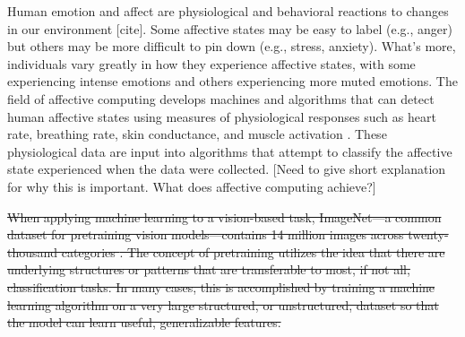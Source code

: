 \documentclass[12pt]{iopart}
\begin{document}
Human emotion and affect are physiological and behavioral reactions to changes in our environment [cite]. Some affective states may be easy to label (e.g., anger) but others may be more difficult to pin down (e.g., stress, anxiety). What's more, individuals vary greatly in how they experience affective states, with some experiencing intense emotions and others experiencing more muted emotions. The field of affective computing develops machines and algorithms that can detect human affective states using measures of physiological responses such as heart rate, breathing rate, skin conductance, and muscle activation \cite{picard2000affective}. These physiological data are input into algorithms that attempt to classify the affective state experienced when the data were collected. [Need to give short explanation for why this is important. What does affective computing achieve?]

\sout{When applying machine learning to a vision-based task, ImageNet---a common dataset for pretraining vision models---contains 14 million images across twenty-thousand categories \cite{deng2009imagenet}.  The concept of pretraining utilizes the idea that there are underlying structures or patterns that are transferable to most, if not all, classification tasks.  In many cases, this is accomplished by training a machine learning algorithm on a very large structured, or unstructured, dataset so that the model can learn useful, generalizable features.}  
\end{document}
